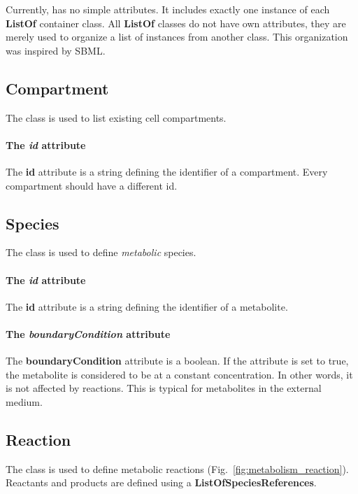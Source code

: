Currently, \rbametabolism{} has no simple attributes.
It includes exactly one instance of each \textbf{ListOf} container class.
All \textbf{ListOf} classes do not have own attributes,
they are merely used to organize a list of instances from another class.
This organization was inspired by SBML.\@


\subsection{Compartment}
\label{sec:compartment}

The \compartment{} class is used to list existing cell compartments.

\paragraph{The \textit{id} attribute}
The \textbf{id} attribute is a string defining the identifier of a compartment.
Every compartment should have a different id.


\subsection{Species}
\label{sec:species}

The \species{} class is used to define \emph{metabolic} species.

\paragraph{The \textit{id} attribute}
The \textbf{id} attribute is a string defining the identifier of a metabolite.

\paragraph{The \textit{boundaryCondition} attribute}
The \textbf{boundaryCondition} attribute is a boolean.
If the attribute is set to true, the metabolite is considered to be at
a constant concentration.
In other words, it is not affected by reactions.
This is typical for metabolites in the external medium.


\subsection{Reaction}
\label{sec:reaction}

The \reaction{} class is used to define metabolic reactions
(Fig.~\ref{fig:metabolism_reaction}).
Reactants and products are defined using a \textbf{ListOfSpeciesReferences}.

